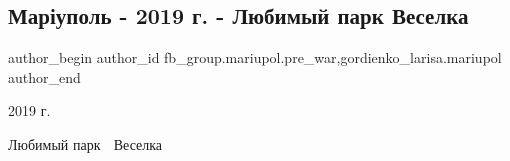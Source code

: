  
 
 
 
 

\subsection{Маріуполь - 2019 г. - Любимый парк Веселка}
\label{sec:25_01_2023.fb.fb_group.mariupol.pre_war.2.mar_upol___2019_g___}
 
\ifcmt
 author_begin
   author_id fb_group.mariupol.pre_war,gordienko_larisa.mariupol
 author_end
\fi

2019 г.

Любимый парк 🌈 Веселка
